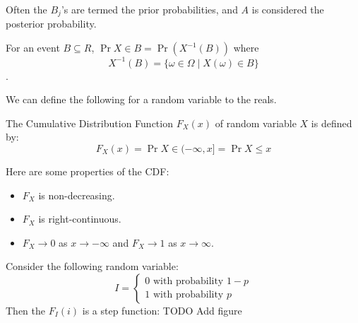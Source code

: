 Often the $B_j$'s are termed the prior probabilities, and $A$ is considered the posterior probability.

For an event $B \subseteq R$, $\Pr{X \in B} = \Pr{(X^{-1}(B))}$ where
\[ X^{-1}(B) = \{ \omega \in \Omega \mid X(\omega) \in B \} \].

We can define the following for a random variable to the reals.
\begin{definition} 
    The Cumulative Distribution Function $F_X(x)$ of random variable $X$ is defined by:
    \[ F_X(x) = \Pr{X \in (- \infty, x]} = \Pr{X \leq x} \]
\end{definition}

Here are some properties of the CDF:
\begin{itemize}
    \item $F_X$ is non-decreasing.
    \item $F_X$ is right-continuous.
    \item $F_X \to 0$ as $x \to -\infty$ and $F_X \to 1$ as $x \to \infty$.
\end{itemize}

\begin{example} 
    Consider the following random variable:
    \[ I = \begin{cases}
        0 \text{ with probability $1-p$} \\
        1 \text{ with probability $p$}
    \end{cases} \]
    Then the $F_I(i)$ is a step function:
    TODO Add figure
\end{example}